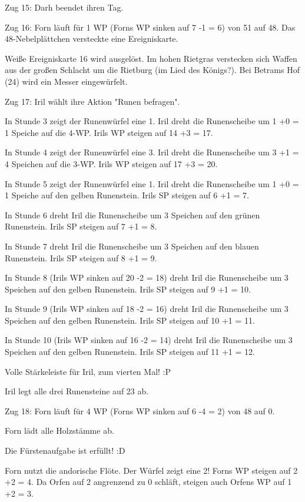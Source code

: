\documentclass[10pt, a4paper, oneside]{book}
\begin{document}
{Zug 15: Darh beendet ihren Tag.



Zug 16: Forn läuft für 1 WP (Forns WP sinken auf 7 -1 = 6) von 51 auf 48. Das 48-Nebelplättchen versteckte eine Ereigniskarte.

Weiße Ereigniskarte 16 wird ausgelöst. Im hohen Rietgras verstecken sich Waffen aus der großen Schlacht um die Rietburg (im Lied des Königs?). Bei Betrams Hof (24) wird ein Messer eingewürfelt.



Zug 17: Iril wählt ihre Aktion "Runen befragen".

In Stunde 3 zeigt der Runenwürfel eine 1. Iril dreht die Runenscheibe um 1 +0 = 1 Speiche auf die 4-WP. Irils WP steigen auf 14 +3 = 17.

In Stunde 4 zeigt der Runenwürfel eine 3. Iril dreht die Runenscheibe um 3 +1 = 4 Speichen auf die 3-WP. Irils WP steigen auf 17 +3 = 20.

In Stunde 5 zeigt der Runenwürfel eine 1. Iril dreht die Runenscheibe um 1 +0 = 1 Speiche auf den gelben Runenstein. Irils SP steigen auf 6 +1 = 7.

In Stunde 6 dreht Iril die Runenscheibe um 3 Speichen auf den grünen Runenstein. Irils SP steigen auf 7 +1 = 8.

In Stunde 7 dreht Iril die Runenscheibe um 3 Speichen auf den blauen Runenstein. Irils SP steigen auf 8 +1 = 9.

In Stunde 8 (Irils WP sinken auf 20 -2 = 18) dreht Iril die Runenscheibe um 3 Speichen auf den gelben Runenstein. Irils SP steigen auf 9 +1 = 10.

In Stunde 9 (Irils WP sinken auf 18 -2 = 16) dreht Iril die Runenscheibe um 3 Speichen auf den gelben Runenstein. Irils SP steigen auf 10 +1 = 11.

In Stunde 10 (Irils WP sinken auf 16 -2 = 14) dreht Iril die Runenscheibe um 3 Speichen auf den gelben Runenstein. Irils SP steigen auf 11 +1 = 12.

Volle Stärkeleiste für Iril, zum vierten Mal! :P

Iril legt alle drei Runensteine auf 23 ab.



Zug 18: Forn läuft für 4 WP (Forns WP sinken auf 6 -4 = 2) von 48 auf 0.

Forn lädt alle Holzstämme ab.

Die Fürstenaufgabe ist erfüllt! :D

Forn nutzt die andorische Flöte. Der Würfel zeigt eine 2! Forns WP steigen auf 2 +2 = 4. Da Orfen auf 2 angrenzend zu 0 schläft, steigen auch Orfens WP auf 1 +2 = 3.



}
\end{document}
